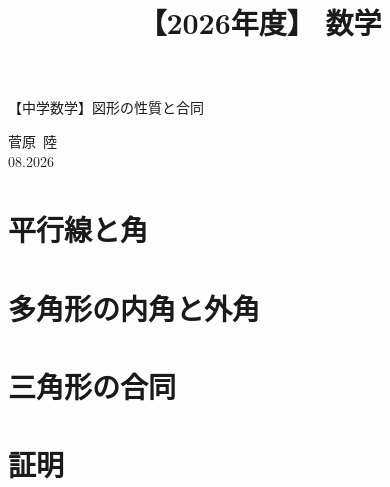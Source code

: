 \documentclass[12pt, a4paper]{jsarticle}
\title{【2026年度】 数学}
\author{}
\date{}
\begin{document}
\begin{center}
{\LARGE 【中学数学】図形の性質と合同}
\end{center}

\vspace{5mm}
\begin{flushright}
  菅原\ 陸\\[1.2em]
  08.2026
\end{flushright}

\section{平行線と角}

\setcounter{subsection}{0}


\section{多角形の内角と外角}



\section{三角形の合同}



\section{証明}



\bookletpadpages
\end{document}
